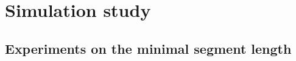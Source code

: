 

\section{Simulation study}\label{chp:4:4}

\subsection{Experiments on the minimal segment length}

